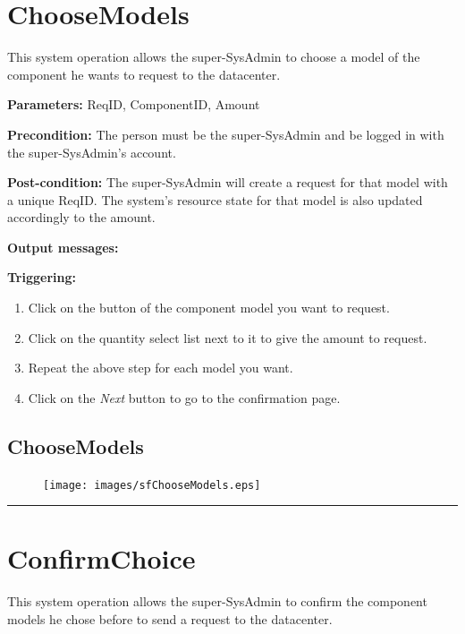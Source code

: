 \section{ChooseModels}
\label{operation:choosemodels}
This system operation allows the super-SysAdmin to choose a model of the
component he wants to request to the datacenter.

\begin{description}

\item \textbf{Parameters:} ReqID, ComponentID, Amount
\item \textbf{Precondition:} The person must be the super-SysAdmin and be logged
in with the super-SysAdmin's account.
\item \textbf{Post-condition:} The super-SysAdmin will create a request for that
model with a unique ReqID. The system's resource state for that model is also
updated accordingly to the amount.
\item \textbf{Output messages:}

\item \textbf{Triggering:}
\begin{enumerate}
\item Click on the button of the component model you want to request.
\item Click on the quantity select list next to it to give the amount to
request.
\item Repeat the above step for each model you want.
\item Click on the \emph{Next} button to go to the confirmation page.
\end{enumerate}

 
\end{description}

\subsection{ChooseModels}




\begin{figure}[H]
\centering
\texttt{[image: images/sfChooseModels.eps]}
\caption{\label{overflow}}
\end{figure}


\hrule
\vspace{0.5cm}



\section{ConfirmChoice}
\label{operation:confirmchoice}
This system operation allows the super-SysAdmin to confirm the component models
he chose before to send a request to the datacenter.

